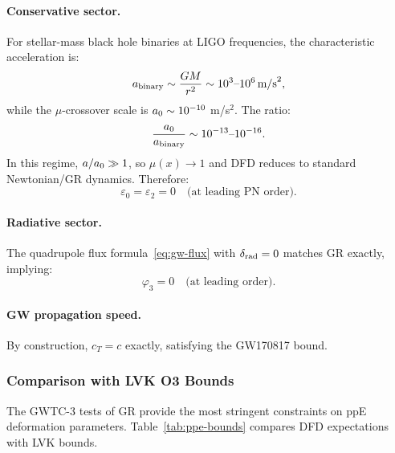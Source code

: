 \paragraph{Conservative sector.}
For stellar-mass black hole binaries at LIGO frequencies, the characteristic acceleration is:
\begin{equation}
a_{\rm binary} \sim \frac{GM}{r^2} \sim 10^{3}\text{--}10^{6}\,\text{m/s}^2,
\end{equation}
while the $\mu$-crossover scale is $a_0 \sim 10^{-10}$ m/s$^2$. The ratio:
\begin{equation}
\frac{a_0}{a_{\rm binary}} \sim 10^{-13}\text{--}10^{-16}.
\end{equation}
In this regime, $a/a_0 \gg 1$, so $\mu(x) \to 1$ and DFD reduces to standard Newtonian/GR dynamics. Therefore:
\begin{equation}
\varepsilon_0 = \varepsilon_2 = 0 \quad \text{(at leading PN order)}.
\end{equation}

\paragraph{Radiative sector.}
The quadrupole flux formula~\eqref{eq:gw-flux} with $\delta_{\rm rad} = 0$ matches GR exactly, implying:
\begin{equation}
\varphi_3 = 0 \quad \text{(at leading order)}.
\end{equation}

\paragraph{GW propagation speed.}
By construction, $c_T = c$ exactly, satisfying the GW170817 bound.

\subsubsection{Comparison with LVK O3 Bounds}\label{sec:gw-o3}

The GWTC-3 tests of GR \cite{LIGO2021TGR} provide the most stringent constraints on ppE deformation parameters. Table~\ref{tab:ppe-bounds} compares DFD expectations with LVK bounds.

